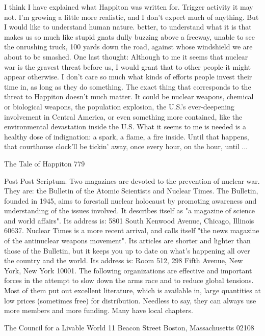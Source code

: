         I think I have explained what Happiton was written for. Trigger activity it may
not. I'm growing a little more realistic, and I don't expect much of anything. But I
would like to understand human nature. better, to understand what it is that makes us
so much like stupid gnats dully buzzing above a freeway, unable to see the onrushing
truck, 100 yards down the road, against whose windshield we are about to be
smashed.
        One last thought: Although to me it seems that nuclear war is the gravest
threat before us, I would grant that to other people it might appear otherwise. I don't
care so much what kinds of efforts people invest their time in, as long as they do
something. The exact thing that corresponds to the threat to Happiton doesn't much
matter. It could be nuclear weapons, chemical or biological weapons, the population
explosion, the U.S.'s ever-deepening involvement in Central America, or even
something more contained, like the environmental devastation inside the U.S. What it
seems to me is needed is a healthy dose of indignation: a spark, a flame, a fire inside.
Until that happens, that courthouse clock'll be tickin' away, once every hour, on the
hour, until ...




The Tale of Happiton                                                                   779

Post Post Scriptum.
        Two magazines are devoted to the prevention of nuclear war. They are: the
Bulletin of the Atomic Scientists and Nuclear Times. The Bulletin, founded in 1945,
aims to forestall nuclear holocaust by promoting awareness and understanding of the
issues involved. It describes itself as "a magazine of science and world affairs". Its
address is: 5801 South Kenwood Avenue, Chicago, Illinois 60637.
        Nuclear Times is a more recent arrival, and calls itself "the news magazine of
the antinuclear weapons movement". Its articles are shorter and lighter than those of
the Bulletin, but it keeps you up to date on what's happening all over the country and
the world. Its address is: Room 512, 298 Fifth Avenue, New York, New York 10001.
        The following organizations are effective and important forces in the attempt
to slow down the arms race and to reduce global tensions. Most of them put out
excellent literature, which is available in, large quantities at low prices (sometimes
free) for distribution. Needless to say, they can always use more members and more
funding. Many have local chapters.

The Council for a Livable World
11 Beacon Street Boston,
Massachusetts 02108

